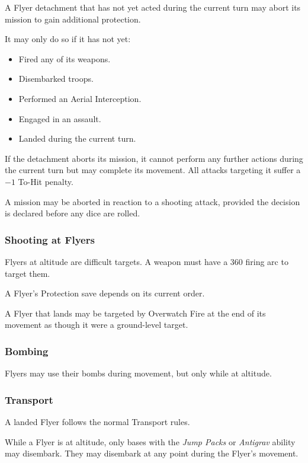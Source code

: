 A Flyer detachment that has not yet acted during the current turn may abort its mission to gain additional protection.

It may only do so if it has not yet:

\begin{itemize}
    \item Fired any of its weapons.
    \item Disembarked troops.
    \item Performed an Aerial Interception.
    \item Engaged in an assault.
    \item Landed during the current turn.
\end{itemize}

If the detachment aborts its mission, it cannot perform any further actions during the current turn but may complete its movement. All attacks targeting it suffer a $-1$ To-Hit penalty.

A mission may be aborted in reaction to a shooting attack, provided the decision is declared before any dice are rolled.

\subsubsection{Shooting at Flyers}

Flyers at altitude are difficult targets. A weapon must have a 360\textdegree{} firing arc to target them.

A Flyer's Protection save depends on its current order.

A Flyer that lands may be targeted by Overwatch Fire at the end of its movement as though it were a ground-level target.

\subsubsection{Bombing}

Flyers may use their bombs during movement, but only while at altitude.

\subsubsection{Transport}

A landed Flyer follows the normal Transport rules.

While a Flyer is at altitude, only bases with the \textit{Jump Packs} or \textit{Antigrav} ability may disembark. They may disembark at any point during the Flyer's movement.

